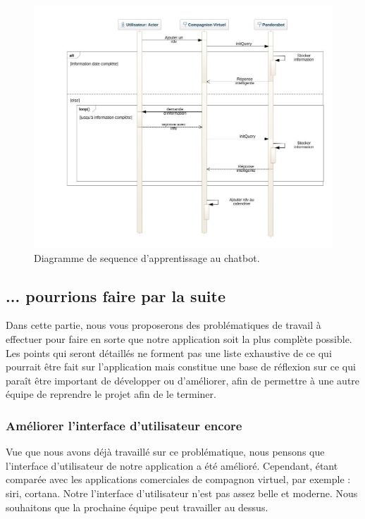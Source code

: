 \begin{figure}[h]
\centering
\includegraphics[width=1\linewidth]{./diagrammes/SequenceDiagram_multi_conversation.jpeg}
\caption{Diagramme de sequence d'apprentissage au chatbot.\label{fig4}}
\end{figure}
\newpage

\subsection{... pourrions faire par la suite}
\indent Dans cette partie, nous vous proposerons des problématiques de travail à effectuer pour faire en sorte que notre application soit la plus complète possible. Les points qui seront détaillés ne forment pas une liste exhaustive de ce qui pourrait être fait sur l'application mais constitue une base de réflexion sur ce qui paraît être important de développer ou d'améliorer, afin de permettre à une autre équipe de reprendre le projet afin de le terminer.

\subsubsection{Améliorer l'interface d'utilisateur encore}
\indent Vue que nous avons déjà travaillé sur ce problématique, nous pensons que l'interface d'utilisateur de notre application a été amélioré. Cependant, étant comparée avec les applications comerciales de compagnon virtuel, par exemple : siri, cortana. Notre l'interface d'utilisateur n'est pas assez belle et moderne. Nous souhaitons que la prochaine équipe peut travailler au dessus.

